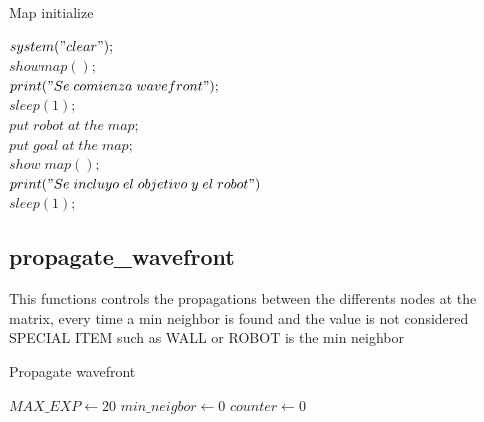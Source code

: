 \documentclass[oneside,twocolumn]{article}
\begin{document}
\begin{center}
  \begin{minipage}{0.7\linewidth} %
    \begin{algorithm}[H] 
      \DontPrintSemicolon
      
      \caption{Map initialize}
      \label{alg:loop}
            {$system("clear");$}\\
            {$show map();$}\\
            {$print("Se\;comienza\;wavefront");$}\\
            {$sleep(1);$}\\
            {$put\;robot\;at\;the\;map;$}\\
            {$put\;goal\;at\;the\;map;$}\\
            {$show\;map();$}\\
            {$print("Se\;incluyo\;el\;objetivo\;y\;el\;robot")$}\\
            {$sleep(1);$}
    \end{algorithm}
  \end{minipage}
\end{center}

\newpage

\subsection{propagate\_wavefront}

This functions controls the propagations between the differents nodes at the matrix, every time a min neighbor is found and the value is not considered SPECIAL ITEM such as WALL or ROBOT is the min neighbor


\begin{algorithm}
\caption{Propagate wavefront}\label{alg:two}
$MAX\_EXP \gets 20$ 
$min\_neigbor \gets 0$\;
$counter \gets 0$\;
\end{algorithm}
\end{document}
